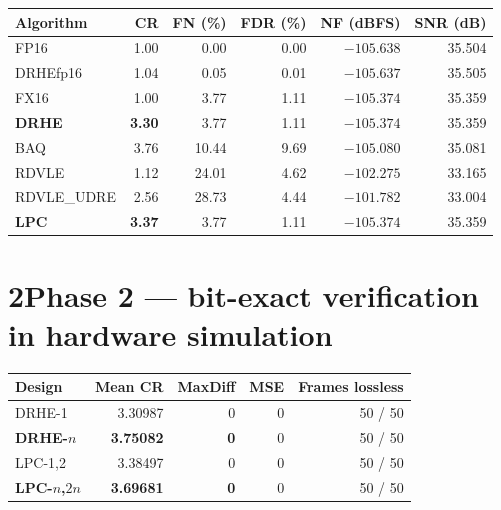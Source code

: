 \documentclass[10pt,a4paper]{article}
\newcommand{\tno}[1]{\textbf{#1}}
\begin{document}
\begin{center}
\begin{minipage}{0.98\textwidth}\centering
{}
\centering\small
\begin{tabular}{@{}lrrrrr@{}}
\toprule
Algorithm & CR & FN (\%) & FDR (\%) & NF (dBFS) & SNR (dB)\\
\midrule
FP16          & 1.00 & 0.00  & 0.00 & $-105.638$ & 35.504\\
DRHEfp16      & 1.04 & 0.05  & 0.01 & $-105.637$ & 35.505\\
FX16          & 1.00 & 3.77  & 1.11 & $-105.374$ & 35.359\\
\tno{DRHE}    & \tno{3.30} & 3.77 & 1.11 & $-105.374$ & 35.359\\
BAQ           & 3.76 & 10.44 & 9.69 & $-105.080$ & 35.081\\
RDVLE         & 1.12 & 24.01 & 4.62 & $-102.275$ & 33.165\\
RDVLE\_UDRE   & 2.56 & 28.73 & 4.44 & $-101.782$ & 33.004\\
\tno{LPC}     & \tno{3.37} & 3.77 & 1.11 & $-105.374$ & 35.359\\
\bottomrule
\end{tabular}
\end{minipage}
\end{center}

\section{2\quad Phase 2 --- bit-exact verification in hardware simulation}

\begin{center}
\begin{minipage}{0.98\textwidth}\centering
{}
\centering\small
\begin{tabular}{@{}lrrrr@{}}
\toprule
Design & Mean CR & MaxDiff & MSE & Frames lossless\\
\midrule
DRHE-1          & \num{3.30987} & 0 & 0 & 50 / 50\\
\tno{DRHE-$n$}  & \tno{\num{3.75082}} & \tno{0} & 0 & 50 / 50\\
LPC-1,2         & \num{3.38497} & 0 & 0 & 50 / 50\\
\tno{LPC-$n$,$2n$} & \tno{\num{3.69681}} & \tno{0} & 0 & 50 / 50\\
\bottomrule
\end{tabular}
\end{minipage}
\end{center}
\end{document}
